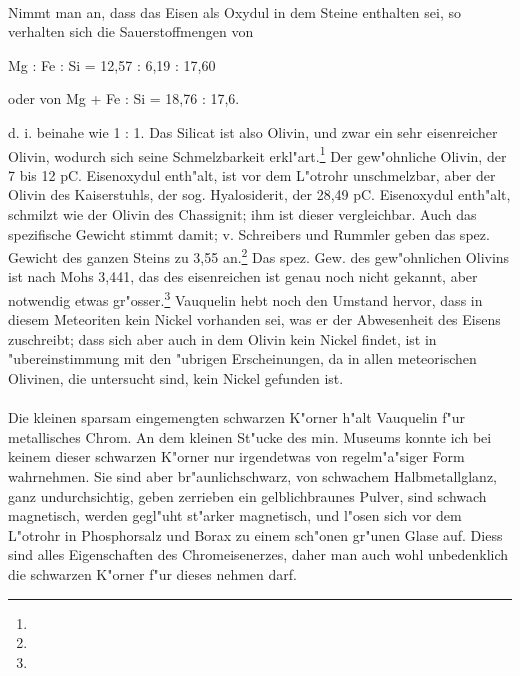 \documentclass[a4paper, 11pt, oneside]{article}
\begin{document}
\paragraph{}
Nimmt man an, dass das Eisen als Oxydul in dem Steine enthalten sei, so verhalten sich die Sauerstoffmengen von
\begin{center}
Mg : Fe : Si = 12,57 : 6,19 : 17,60 
\end{center}
\begin{center}
oder von Mg + Fe : Si = 18,76 : 17,6.
\end{center}
d. i. beinahe wie 1 : 1. Das Silicat ist also Olivin, und zwar ein sehr eisenreicher Olivin, wodurch sich seine Schmelzbarkeit erkl"art.\footnote{} Der gew"ohnliche Olivin, der 7 bis 12 pC. Eisenoxydul enth"alt, ist vor dem L"otrohr unschmelzbar, aber der Olivin des Kaiserstuhls, der sog. Hyalosiderit, der 28,49 pC. Eisenoxydul enth"alt, schmilzt wie der Olivin des Chassignit; ihm ist dieser vergleichbar. Auch das spezifische Gewicht stimmt damit; v. Schreibers und Rummler geben das spez. Gewicht des ganzen Steins zu 3,55 an.\footnote{} Das spez. Gew. des gew"ohnlichen Olivins ist nach Mohs 3,441, das des eisenreichen ist genau noch nicht gekannt, aber notwendig etwas gr"osser.\footnote{} Vauquelin hebt noch den Umstand hervor, dass in diesem Meteoriten kein Nickel vorhanden sei, was er der Abwesenheit des Eisens zuschreibt; dass sich aber auch in dem Olivin kein Nickel findet, ist in "ubereinstimmung mit den "ubrigen Erscheinungen, da in allen meteorischen Olivinen, die untersucht sind, kein Nickel gefunden ist.
\paragraph{}
Die kleinen sparsam eingemengten schwarzen K"orner h"alt Vauquelin f"ur metallisches Chrom. An dem kleinen St"ucke des min. Museums konnte ich bei keinem dieser schwarzen K"orner nur irgendetwas von regelm"a"siger Form wahrnehmen. Sie sind aber br"aunlichschwarz, von schwachem Halbmetallglanz, ganz undurchsichtig, geben zerrieben ein gelblichbraunes Pulver, sind schwach magnetisch, werden gegl"uht st"arker magnetisch, und l"osen sich vor dem L"otrohr in Phosphorsalz und Borax zu einem sch"onen gr"unen Glase auf. Diess sind alles Eigenschaften des Chromeisenerzes, daher man auch wohl unbedenklich die schwarzen K"orner f"ur dieses nehmen darf.
\end{document}
